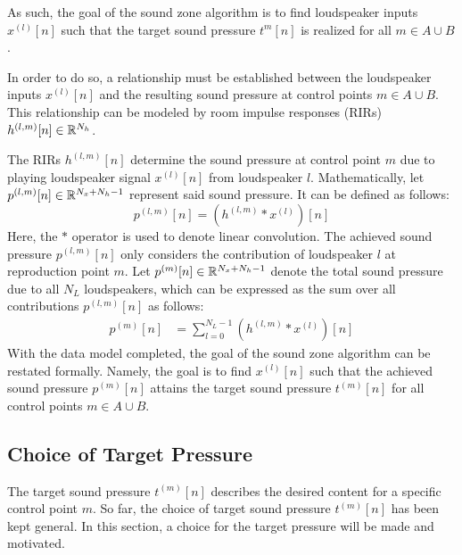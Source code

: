 As such, the goal of the sound zone algorithm is to find loudspeaker inputs $x^{(l)}[n]$ 
such that the target sound pressure $t^{m}[n]$ is realized for all $m\in A \cup B$.

In order to do so, a relationship must be established between the loudspeaker inputs $x^{(l)}[n]$
and the resulting sound pressure at control points $m\in A \cup B$. 
This relationship can be modeled by room impulse responses (RIRs) $h^{(l,m)}[n]\in\mathbb{R}^{N_h}$.

The RIRs $h^{(l,m)}[n]$ determine the sound pressure at control point $m$ due to playing loudspeaker signal $x^{(l)}[n]$ from loudspeaker $l$. 
Mathematically, let $p^{(l,m)}[n]\in\mathbb{R}^{N_x + N_h - 1}$ represent said sound pressure. 
It can be defined as follows:
\begin{equation}
    p^{(l,m)}[n] = \left(h^{(l,m)} \ast x^{(l)}\right)[n]
\end{equation}
Here, the $\ast$ operator is used to denote linear convolution. 
The achieved sound pressure $p^{(l,m)}[n]$ only considers the contribution of loudspeaker $l$ at reproduction point $m$.
Let $p^{(m)}[n]\in\mathbb{R}^{N_x + N_h - 1}$ denote the total sound pressure due to all $N_L$ loudspeakers,
which can be expressed as the sum over all contributions $p^{(l,m)}[n]$ as follows: 
\begin{align}
    p^{(m)}[n] &= \sum_{l=0}^{N_L - 1} \left(h^{(l,m)} \ast x^{(l)}\right)[n]\label{eq:sound_zone:data_model:achieved_pressure}
\end{align}
With the data model completed, the goal of the sound zone algorithm can be restated formally.
Namely, the goal is to find $x^{(l)}[n]$ such that the achieved sound pressure $p^{(m)}[n]$ attains the
target sound pressure $t^{(m)}[n]$ for all control points $m\in A \cup B$.

\subsection{Choice of Target Pressure}
\label{ch:sound_zone:data_model:target_pressure_choice}
The target sound pressure $t^{(m)}[n]$ describes the desired content for a specific control point $m$. 
So far, the choice of target sound pressure $t^{(m)}[n]$ has been kept general. 
In this section, a choice for the target pressure will be made and motivated.

